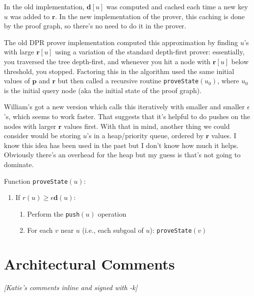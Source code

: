 \documentclass[12pt]{article}
\newcommand{\vek}[1]{\textbf{#1}}
\begin{document}
In the old implementation, $\vek{d}[u]$ was computed and cached each
time a new key $u$ was added to $\vek{r}$.  In the new implementation
of the prover, this caching is done by the proof graph, so there's no
need to do it in the prover.  

The old DPR prover implementation computed this approximation by
finding $u$'s with large $\vek{r}[u]$ using a variation of the
standard depth-first prover: essentially, you traversed the tree
depth-first, and whenever you hit a node with $\vek{r}[u]$ below
threshold, you stopped.  Factoring this in the algorithm used the same
initial values of $\vek{p}$ and $\vek{r}$ but then called a recursive
routine \texttt{proveState}$(u_0)$, where $u_0$ is the initial query
node (aka the initial state of the proof graph).

William's got a new version which calls this iteratively with smaller
and smaller $\epsilon$'s, which seems to work faster.  That suggests
that it's helpful to do pushes on the nodes with larger $\vek{r}$
values first.  With that in mind, another thing we could consider
would be storing $u$'s in a heap/priority queue, ordered by $\vek{r}$
values.  I know this idea has been used in the past but I don't know
how much it helps.  Obviously there's an overhead for the heap but my
guess is that's not going to dominate.

\bigskip

\noindent Function \texttt{proveState}$(u)$:
\begin{enumerate}
\item If $r(u)\geq{}\epsilon \vek{d}(u)$:
  \begin{enumerate}
  \item Perform the \texttt{push}$(u)$ operation
  \item For each $v$ near $u$ (i.e., each subgoal of $u$): \texttt{proveState}$(v)$
  \end{enumerate}
\end{enumerate}


\section{Architectural Comments}

\emph{ [Katie's comments inline and signed with -k]}
\end{document}
